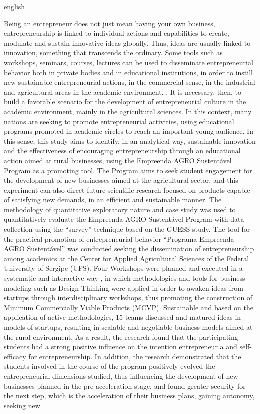 \setlength{\absparsep}{18pt} %
\begin{resumo}[Abstract]
 \begin{otherlanguage*}{english}
   
Being an entrepreneur does not just mean having your own business, entrepreneurship is linked to individual actions and capabilities to create, modulate and sustain innovative ideas globally. Thus, ideas are usually linked to innovation, something that transcends the ordinary. Some tools such as workshops, seminars, courses, lectures can be used to disseminate entrepreneurial behavior both in private bodies and in educational institutions, in order to instill new sustainable entrepreneurial actions, in the commercial sense, in the industrial and agricultural areas in the academic environment. . It is necessary, then, to build a favorable scenario for the development of entrepreneurial culture in the academic environment, mainly in the agricultural sciences. In this context, many nations are seeking to promote entrepreneurial activities, using educational programs promoted in academic circles to reach an important young audience. In this sense, this study aims to identify, in an analytical way, sustainable innovation and the effectiveness of encouraging entrepreneurship through an educational action aimed at rural businesses, using the Empreenda AGRO Sustentável Program as a promoting tool. The Program aims to seek student engagement for the development of new businesses aimed at the agricultural sector, and this experiment can also direct future scientific research focused on products capable of satisfying new demands, in an efficient and sustainable manner. The methodology of quantitative exploratory nature and case study was used to quantitatively evaluate the Empreenda AGRO Sustentável Program with data collection using the “survey” technique based on the GUESS study. The tool for the practical promotion of entrepreneurial behavior “Programa Empreenda AGRO Sustentável” was conducted seeking the dissemination of entrepreneurship among academics at the Center for Applied Agricultural Sciences of the Federal University of Sergipe (UFS). Four Workshops were planned and executed in a systematic and interactive way , in which methodologies and tools for business modeling such as Design Thinking were applied in order to awaken ideas from startups through interdisciplinary workshops, thus promoting the construction of Minimum Commercially Viable Products (MCVP). Sustainable and based on the application of active methodologies, 15 teams discussed and matured ideas in models of startups, resulting in scalable and negotiable business models aimed at the rural environment. As a result, the research found that the participating students had a strong positive influence on the intention entrepreneur a and self-efficacy for entrepreneurship. In addition, the research demonstrated that the students involved in the course of the program positively evolved the entrepreneurial dimensions studied, thus influencing the development of new businesses planned in the pre-acceleration stage, and found greater security for the next step, which is the acceleration of their business plans, gaining autonomy, seeking new 
\end{otherlanguage*}
\end{resumo}
